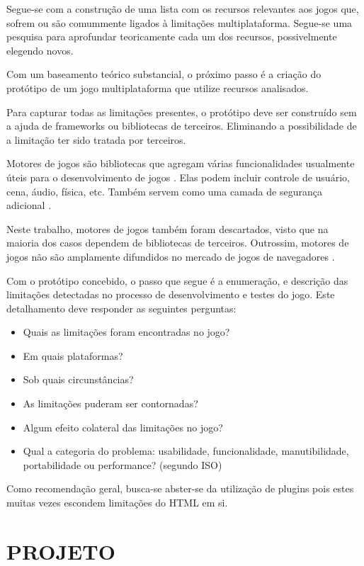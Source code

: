 \documentclass[
12pt,
a4paper,
portuges,
draft
]{report}
\begin{document}
Segue-se com a construção de uma lista com os recursos relevantes
aos jogos que, sofrem ou são comummente ligados à
limitações multiplataforma. Segue-se uma pesquisa para aprofundar
teoricamente cada um dos recursos, possivelmente elegendo novos.

Com um baseamento teórico substancial, o próximo passo é a criação
do protótipo de um jogo multiplataforma que utilize recursos
analisados.

Para capturar todas as limitações presentes, o protótipo deve ser
construído sem a ajuda de frameworks ou bibliotecas de terceiros.
Eliminando a possibilidade de a limitação ter sido tratada por
terceiros.

Motores de jogos são bibliotecas que agregam várias funcionalidades
usualmente úteis para o desenvolvimento de jogos \autocite[pp.
5]{browserGamesTechnologyAndFuture}. Elas podem incluir controle
de usuário, cena, áudio, física, etc. Também servem como uma camada de 
segurança adicional \autocite{browserGamesTechnologyAndFuture}.

Neste trabalho, motores
de jogos também foram descartados, visto que na maioria dos casos
dependem de bibliotecas de terceiros. Outrossim, motores de jogos
não são amplamente difundidos no mercado de jogos de navegadores
\autocite{browserGamesTechnologyAndFuture}.

Com o protótipo concebido, o passo que segue é a enumeração, e
descrição das limitações detectadas no processo de desenvolvimento e
testes do jogo. Este detalhamento deve responder as seguintes perguntas:

\begin{itemize}
\item Quais as limitações foram encontradas no jogo?
\item Em quais plataformas?
\item Sob quais circunstâncias?
\item As limitações puderam ser contornadas?
\item Algum efeito colateral das limitações no jogo?
\item Qual a categoria do problema: usabilidade, funcionalidade, manutibilidade, portabilidade ou performance? (segundo ISO)
\end{itemize}

Como recomendação geral, busca-se abster-se da utilização de plugins
pois estes muitas vezes escondem limitações do HTML em si.

\chapter{PROJETO}
\thispagestyle{myheadings}
\end{document}
